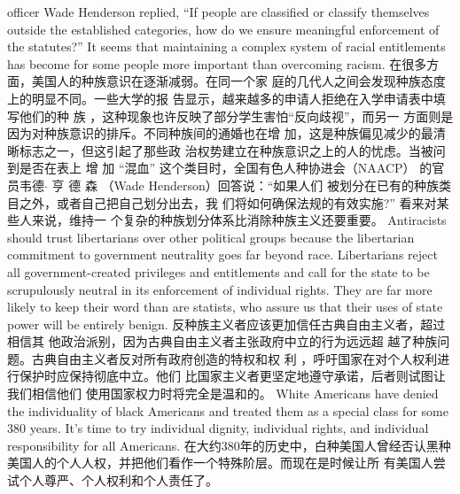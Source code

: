 \begin{paracol}{2}
officer Wade Henderson replied, ``If people are classified or classify themselves outside the established categories, how do we
ensure meaningful enforcement of the statutes?'' It seems that
maintaining a complex system of racial entitlements has become for some people more important than overcoming racism.
\switchcolumn
在很多方面，美国人的种族意识在逐渐减弱。在同一个家
庭的几代人之间会发现种族态度上的明显不同。一些大学的报
告显示，越来越多的申请人拒绝在入学申请表中填写他们的种
族 ，这种现象也许反映了部分学生害怕“反向歧视”，而另一
方面则是因为对种族意识的排斥。不同种族间的通婚也在增
加，这是种族偏见减少的最清晰标志之一，但这引起了那些政
治权势建立在种族意识之上的人的忧虑。当被问到是否在表上
增 加 “混血” 这个类目时，全国有色人种协进会（NAACP）
的官员韦德$\cdot$ 亨 德 森 （Wade  Henderson）回答说：“如果人们
被划分在已有的种族类目之外，或者自己把自己划分出去，我
们将如何确保法规的有效实施?” 看来对某些人来说，维持一
个复杂的种族划分体系比消除种族主义还要重要。
\switchcolumn*
Antiracists should trust libertarians over other political
groups because the libertarian commitment to government
neutrality goes far beyond race. Libertarians reject all government-created privileges and entitlements and call for the state
to be scrupulously neutral in its enforcement of individual rights. They are far more likely to keep their word than are statists, who assure us that their uses of state power will be entirely
benign.
\switchcolumn
反种族主义者应该更加信任古典自由主义者，超过相信其
他政治派别，因为古典自由主义者主张政府中立的行为远远超
越了种族问题。古典自由主义者反对所有政府创造的特权和权
利 ，呼吁国家在对个人权利进行保护时应保持彻底中立。他们
比国家主义者更坚定地遵守承诺，后者则试图让我们相信他们
使用国家权力时将完全是温和的。
\switchcolumn*
White Americans have denied the individuality of black
Americans and treated them as a special class for some 380
years. It's time to try individual dignity, individual rights, and
individual responsibility for all Americans.
\switchcolumn
在大约380年的历史中，白种美国人曾经否认黑种美国人的个人人权，并把他们看作一个特殊阶层。而现在是时候让所
有美国人尝试个人尊严、个人权利和个人责任了。


\end{paracol}
